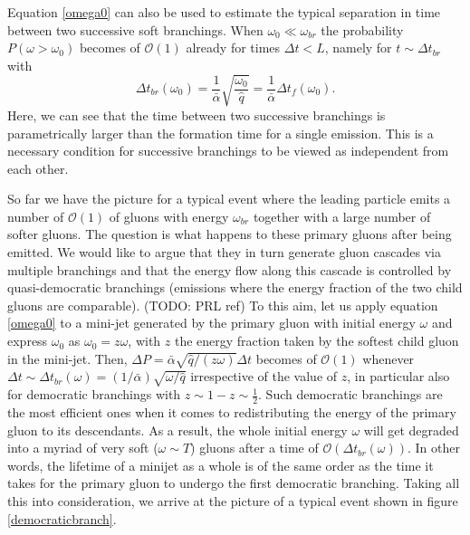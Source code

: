 \documentclass[a4paper,12pt]{article}
\numberwithin{equation}{section}
\begin{document}
Equation \eqref{omega0} can also be used to estimate the typical separation in time between two successive soft branchings. When $\omega_0 \ll \omega_{br}$ the probability $P(\omega>\omega_0)$ becomes of $\mathcal{O}(1)$ already for times $ \Delta t < L$, namely for $t\sim \Delta t_{br}$ with
\begin{equation}
\Delta t_{br}(\omega_0)=\frac{1}{\bar{\alpha}} \sqrt{\frac{\omega_0}{\hat{q}}} = \frac{1}{\bar{\alpha}} \Delta t_f(\omega_0).
\end{equation}
Here, we can see that the time between two successive branchings is parametrically larger than the formation time for a single emission. This is a necessary condition for successive branchings to be viewed as independent from each other. 

So far we have the picture for a typical event where the leading particle emits a number of $\mathcal{O}(1)$ of gluons with energy $\omega_{br}$ together with a large number of softer gluons. The question is what happens to these primary gluons after being emitted. We would like to argue that they in turn generate gluon cascades via multiple branchings and that the energy flow along this cascade is controlled by quasi-democratic branchings (emissions where the energy fraction of the two child gluons are comparable). (TODO: PRL ref) To this aim, let us apply equation \eqref{omega0} to a mini-jet generated by the primary gluon with initial energy $\omega$ and express $\omega_0$ as $\omega_0=z\omega$, with $z$ the energy fraction taken by the softest child gluon in the mini-jet. Then, $\Delta P = \bar{\alpha} \sqrt{{\hat{q}}/{(z \omega)}}\Delta t$ becomes of $\mathcal{O}(1)$ whenever $\Delta t \sim \Delta t_{br}(\omega)=({1}/{\bar{\alpha}}) \sqrt{{\omega}/{\hat{q}}}$ irrespective of the value of $z$, in particular also for democratic branchings with $z \sim 1-z \sim \frac{1}{2}$. Such democratic branchings are the most efficient ones when it comes to redistributing the energy of the primary gluon to its descendants. As a result, the whole initial energy $\omega$ will get degraded into a myriad of very soft ($\omega \sim T$) gluons after a time of $\mathcal{O}(\Delta t_{br}(\omega))$. In other words, the lifetime of a minijet as a whole is of the same order as the time it takes for the primary gluon to undergo the first democratic branching.
Taking all this into consideration, we arrive at the picture of a typical event shown in figure \ref{democraticbranch}.
\end{document}
